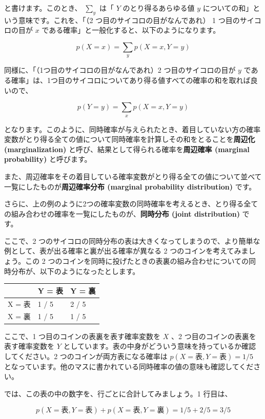 と書けます。このとき、 $\sum_y$ は「 $Y$ のとり得るあらゆる値 $y$ についての和」という意味です。これを、「（2 つ目のサイコロの目がなんであれ） 1 つ目のサイコロの目が $x$ である確率」と一般化すると、以下のようになります。


\[
p(X = x) = \sum_y p(X = x, Y = y)
\]


同様に、「（1つ目のサイコロの目がなんであれ）2 つ目のサイコロの目が $y$ である確率」は、1つ目のサイコロについてあり得る値すべての確率の和を取れば良いので、


\[
p(Y = y) = \sum_x p(X = x, Y = y)
\]


となります。このように、同時確率が与えられたとき、着目していない方の確率変数がとり得る全ての値について同時確率を計算しその和をとることを\textbf{周辺化 (marginalization)} と呼び、結果として得られる確率を\textbf{周辺確率 (marginal probability)} と呼びます。

また、周辺確率をその着目している確率変数がとり得る全ての値について並べて一覧にしたものが\textbf{周辺確率分布 (marginal probability distribution)} です。

さらに、上の例のように2つの確率変数の同時確率を考えるとき、とり得る全ての組み合わせの確率を一覧にしたものが、\textbf{同時分布 (joint distribution)} です。


ここで、2 つのサイコロの同時分布の表は大きくなってしまうので、より簡単な例として、表が出る確率と裏が出る確率が異なる 2 つのコインを考えてみましょう。この 2 つのコインを同時に投げたときの表裏の組み合わせについての同時分布が、以下のようになったとします。



\begin{center}
\begin{tabular}{|l|l|l|}
\hline
$\ $ & Y = 表 & Y = 裏 \\
\hline
X = 表 & 1 / 5 & 2 / 5 \\
X = 裏 & 1 / 5 & 1 / 5 \\
\hline
\end{tabular}
\end{center}


ここで、1 つ目のコインの表裏を表す確率変数を $X$ 、2 つ目のコインの表裏を表す確率変数を $Y$ としています。表の中身がどういう意味を持っているか確認してください。2 つのコインが両方表になる確率は $p(X = 表, Y = 表) = 1 / 5$ となっています。他のマスに書かれている同時確率の値の意味も確認してください。


では、この表の中の数字を、行ごとに合計してみましょう。1 行目は、


\[
p(X = 表, Y = 表) + p(X = 表, Y = 裏) = 1 / 5 + 2 / 5 = 3 / 5
\]


